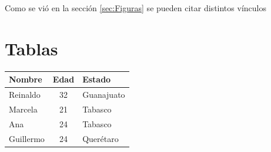 \documentclass[twocolumn]{article}
\begin{document}
Como se vi\'o en la secci\'on \ref{sec:Figuras} se pueden citar distintos v\'inculos



\section{Tablas} %
\label{sec:Tablas}
\begin{center}
	

\begin{tabular}{|l|c|l|}

\hline
\textbf{Nombre} & \textbf{Edad} & \textbf{Estado} \\
\hline	
\hline	

Reinaldo   &  32  &  Guanajuato \\
Marcela    &  21  &  Tabasco \\
Ana & 24 & Tabasco \\
Guillermo  &  24  &  Quer\'etaro \\

\hline

\end{tabular}
\end{center}



\end{document}
